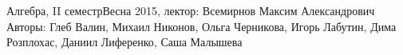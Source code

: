 


\BigHeader
	{Алгебра, II семестр}{Весна 2015, лектор: Всемирнов Максим Александрович}
	{Авторы: Глеб Валин, Михаил Никонов, Ольга Черникова, Игорь Лабутин, Дима Розплохас, Даниил Лиференко, Саша Малышева}
	
 









